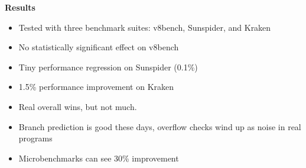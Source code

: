 \documentclass{slides}
\begin{document}
\begin{slide}
\begin{center}
{\Huge \bf{Results }}
\end{center}
\begin{itemize}
\item Tested with three benchmark suites: v8bench, Sunspider, and Kraken
\item No statistically significant effect on v8bench
\item Tiny performance regression on Sunspider (0.1\%)
\item 1.5\% performance improvement on Kraken
\item Real overall wins, but not much.
\item Branch prediction is good these days, overflow checks wind up as
  noise in real programs
\item Microbenchmarks can see 30\% improvement
\end{itemize}
\end{slide}
\end{document}

